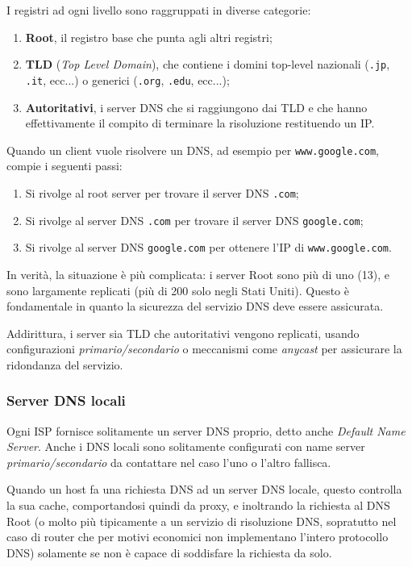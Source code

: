 \documentclass[a4paper,11pt]{article}
\begin{document}
I registri ad ogni livello sono raggruppati in diverse categorie:
\begin{enumerate}
	\item \textbf{Root}, il registro base che punta agli altri registri;
	\item \textbf{TLD} (\textit{Top Level Domain}), che contiene i domini top-level nazionali (\lstinline|.jp|, \lstinline|.it|, ecc...) o generici (\lstinline|.org|, \lstinline|.edu|, ecc...);
	\item \textbf{Autoritativi}, i server DNS che si raggiungono dai TLD e che hanno effettivamente il compito di terminare la risoluzione restituendo un IP.
\end{enumerate}

Quando un client vuole risolvere un DNS, ad esempio per \lstinline|www.google.com|, compie i seguenti passi:
\begin{enumerate}
	\item Si rivolge al root server per trovare il server DNS \lstinline|.com|;
	\item Si rivolge al server DNS \lstinline|.com| per trovare il server DNS \lstinline|google.com|;
	\item Si rivolge al server DNS \lstinline|google.com| per ottenere l'IP di \lstinline|www.google.com|.
\end{enumerate}

In verità, la situazione è più complicata: i server Root sono più di uno (13), e sono largamente replicati (più di 200 solo negli Stati Uniti). Questo è fondamentale in quanto la sicurezza del servizio DNS deve essere assicurata.

Addirittura, i server sia TLD che autoritativi vengono replicati, usando configurazioni \textit{primario/secondario} o meccanismi come \textit{anycast} per assicurare la ridondanza del servizio.

\subsubsection{Server DNS locali}
Ogni ISP fornisce solitamente un server DNS proprio, detto anche \textit{Default Name Server}.
Anche i DNS locali sono solitamente configurati con name server \textit{primario/secondario} da contattare nel caso l'uno o l'altro fallisca. 

Quando un host fa una richiesta DNS ad un server DNS locale, questo controlla la sua cache, comportandosi quindi da proxy, e inoltrando la richiesta al DNS Root (o molto più tipicamente a un servizio di risoluzione DNS, sopratutto nel caso di router che per motivi economici non implementano l'intero protocollo DNS) solamente se non è capace di soddisfare la richiesta da solo.
\end{document}

